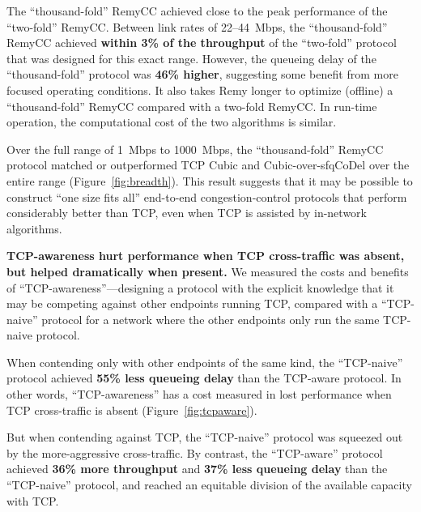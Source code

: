 The ``thousand-fold'' RemyCC achieved close to the peak performance of
the ``two-fold'' RemyCC. Between link rates of 22--44~Mbps, the
``thousand-fold'' RemyCC achieved \textbf{within 3\% of the throughput}
of the ``two-fold'' protocol that was designed for this exact
range. However, the queueing delay of the ``thousand-fold'' protocol
was \textbf{46\% higher}, suggesting some benefit from more focused
operating conditions. It also takes Remy longer to optimize (offline)
a ``thousand-fold'' RemyCC compared with a two-fold RemyCC. In run-time
operation, the computational cost of the two algorithms is
similar.

Over the full range of 1~Mbps to 1000~Mbps, the ``thousand-fold''
RemyCC protocol matched or outperformed TCP Cubic and
Cubic-over-sfqCoDel over the entire range
(Figure~\ref{fig:breadth}). This result suggests that it may be
possible to construct ``one size fits all'' end-to-end
congestion-control protocols that perform considerably better than
TCP, even when TCP is assisted by in-network algorithms.

\vspace{\baselineskip}

\noindent \textbf{TCP-awareness hurt performance when TCP
  cross-traffic was absent, but helped dramatically when present.} We
measured the costs and benefits of ``TCP-awareness''---designing a
protocol with the explicit knowledge that it may be competing against
other endpoints running TCP, compared with a ``TCP-naive'' protocol
for a network where the other endpoints only run the same TCP-naive
protocol.

When contending only with other endpoints of the same kind, the
``TCP-naive'' protocol achieved \textbf{55\% less queueing delay} than
the TCP-aware protocol. In other words, ``TCP-awareness'' has a cost
measured in lost performance when TCP cross-traffic is absent
(Figure~\ref{fig:tcpaware}).

But when contending against TCP, the ``TCP-naive'' protocol was
squeezed out by the more-aggressive cross-traffic. By contrast, the
``TCP-aware'' protocol achieved \textbf{36\% more throughput} and
\textbf{37\% less queueing delay} than the ``TCP-naive'' protocol,
and reached an equitable division of the available capacity with TCP.
